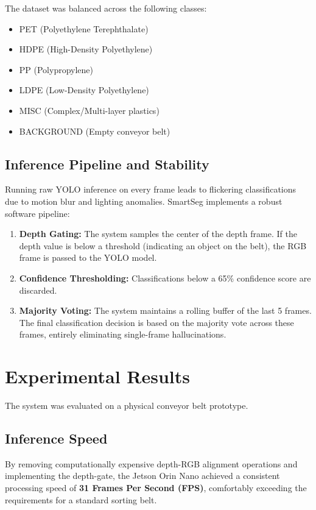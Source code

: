 \documentclass[conference,onecolumn]{IEEEtran}
\begin{document}
The dataset was balanced across the following classes:
\begin{itemize}
    \item PET (Polyethylene Terephthalate)
    \item HDPE (High-Density Polyethylene)
    \item PP (Polypropylene)
    \item LDPE (Low-Density Polyethylene)
    \item MISC (Complex/Multi-layer plastics)
    \item BACKGROUND (Empty conveyor belt)
\end{itemize}

\subsection{Inference Pipeline and Stability}
Running raw YOLO inference on every frame leads to flickering classifications due to motion blur and lighting anomalies. SmartSeg implements a robust software pipeline:
\begin{enumerate}
    \item \textbf{Depth Gating:} The system samples the center of the depth frame. If the depth value is below a threshold (indicating an object on the belt), the RGB frame is passed to the YOLO model.
    \item \textbf{Confidence Thresholding:} Classifications below a 65\% confidence score are discarded.
    \item \textbf{Majority Voting:} The system maintains a rolling buffer of the last 5 frames. The final classification decision is based on the majority vote across these frames, entirely eliminating single-frame hallucinations.
\end{enumerate}

\section{Experimental Results}
The system was evaluated on a physical conveyor belt prototype. 

\subsection{Inference Speed}
By removing computationally expensive depth-RGB alignment operations and implementing the depth-gate, the Jetson Orin Nano achieved a consistent processing speed of \textbf{31 Frames Per Second (FPS)}, comfortably exceeding the requirements for a standard sorting belt.
\end{document}
